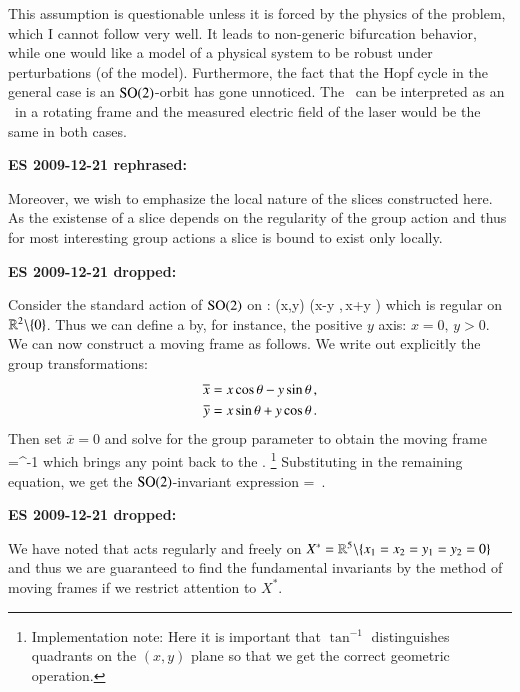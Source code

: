 This assumption is questionable unless it
is forced by the physics of the problem, which I cannot
follow very well. It leads to non-generic bifurcation
behavior, while one would like a model of a physical system
to be robust under perturbations (of the model). Furthermore,
the fact that the Hopf cycle in the general case is an
$\textrm{SO}(2)$-orbit has gone unnoticed. The \reqv\ can be
interpreted as an \eqv\ in a rotating frame and the measured
electric field of the laser would be the same in both cases.

{\bf ES 2009-12-21 rephrased:}

Moreover, we wish to emphasize the local nature
of the slices constructed here. As the existense of a slice
depends on the regularity of the group action
and thus for most interesting group actions a slice is bound to
exist only locally.

{\bf ES 2009-12-21 dropped:}

\begin{example}
Consider the standard action of $\textrm{SO}(2)$ on :
\beq
	(x,y) \mapsto (x\cos\theta -y \sin\theta,\,x\sin\theta +y \cos\theta )
\eeq
which is regular on $\mathbb{R}^{2}\backslash\{0\}$. Thus we can define
a {\csection} by, for instance, the
positive $y$ axis: $x=0,\,y>0$.
We can now construct a moving frame as follows. We write out
explicitly the group transformations:
\begin{subequations}
\begin{align}
 	\overline{x} &= x \cos\theta - y \sin\theta\label{eq:explSO2stnd1}\,, \\ 
	\overline{y} &= x \sin\theta + y \cos\theta\label{eq:explSO2stnd2}\,.
\end{align}
\end{subequations}
Then set $\overline{x}=0$ and solve  for the group
parameter to obtain the moving frame
\beq
	\theta=\tan^{-1}
	\label{eq:SO2stndMF}
\eeq
which brings any point  back to the {\csection}.
\footnote{Implementation note: Here it is important that
$\tan^{-1}$ distinguishes quadrants on the $(x,y)$ plane so
that we get the correct geometric operation.}
Substituting  in the remaining equation,
we get the $\textrm{SO}(2)$-invariant expression
\beq
	 = \,.
\eeq
\end{example}

{\bf ES 2009-12-21 dropped:}

We have noted that  acts regularly and freely on
$X^*=\mathbb{R}^{5}\backslash\{x_1=x_2=y_1=y_2=0\}$ and thus we are
guaranteed to find the fundamental invariants by the method
of moving frames if we restrict attention to $X^*$.

